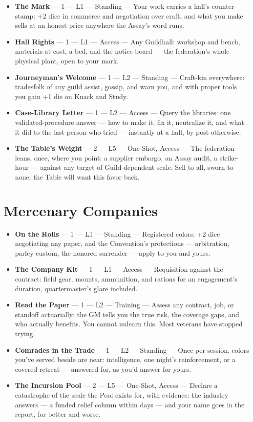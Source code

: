 \begin{itemize}
    \item \textbf{The Mark} --- 1 --- L1 --- Standing --- Your work carries a hall's counter-stamp: +2 dice in commerce and negotiation over craft, and what you make sells at an honest price anywhere the Assay's word runs.
    \item \textbf{Hall Rights} --- 1 --- L1 --- Access --- Any Guildhall: workshop and bench, materials at cost, a bed, and the notice board --- the federation's whole physical plant, open to your mark.
    \item \textbf{Journeyman's Welcome} --- 1 --- L2 --- Standing --- Craft-kin everywhere: tradesfolk of any guild assist, gossip, and warn you, and with proper tools you gain +1 die on Knack and Study.
    \item \textbf{Case-Library Letter} --- 1 --- L2 --- Access --- Query the libraries: one validated-procedure answer --- how to make it, fix it, neutralize it, and what it did to the last person who tried --- instantly at a hall, by post otherwise.
    \item \textbf{The Table's Weight} --- 2 --- L5 --- One-Shot, Access --- The federation leans, once, where you point: a supplier embargo, an Assay audit, a strike-hour --- against any target of Guild-dependent scale. Sell to all, sworn to none; the Table will want this favor back.
\end{itemize}

\section{Mercenary Companies}

\begin{itemize}
    \item \textbf{On the Rolls} --- 1 --- L1 --- Standing --- Registered colors: +2 dice negotiating any paper, and the Convention's protections --- arbitration, parley custom, the honored surrender --- apply to you and yours.
    \item \textbf{The Company Kit} --- 1 --- L1 --- Access --- Requisition against the contract: field gear, mounts, ammunition, and rations for an engagement's duration, quartermaster's glare included.
    \item \textbf{Read the Paper} --- 1 --- L2 --- Training --- Assess any contract, job, or standoff actuarially: the GM tells you the true risk, the coverage gaps, and who actually benefits. You cannot unlearn this. Most veterans have stopped trying.
    \item \textbf{Comrades in the Trade} --- 1 --- L2 --- Standing --- Once per session, colors you've served beside are near: intelligence, one night's reinforcement, or a covered retreat --- answered for, as you'd answer for yours.
    \item \textbf{The Incursion Pool} --- 2 --- L5 --- One-Shot, Access --- Declare a catastrophe of the scale the Pool exists for, with evidence: the industry answers --- a funded relief column within days --- and your name goes in the report, for better and worse.
\end{itemize}

